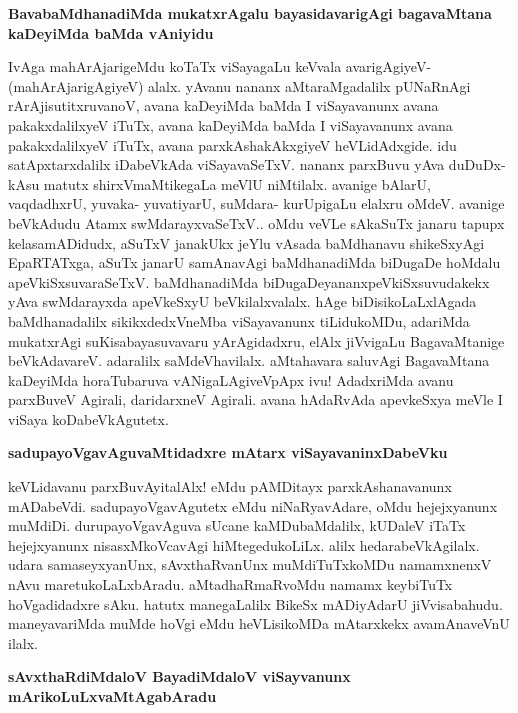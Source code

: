 \noindent
{\bf\large{BavabaMdhanadiMda mukatxrAgalu bayasidavarigAgi bagavaMtana kaDeyiMda baMda vAniyidu}}\label{page251}

IvAga mahArAjarigeMdu koTaTx viSayagaLu keVvala avarigAgiyeV- (mahArAjarigAgiyeV) alalx. yAvanu nananx aMtaraMgadalilx pUNaRnAgi rArAjisutitxruvanoV, avana kaDeyiMda baMda I viSayavanunx avana pakakxdalilxyeV iTuTx, avana kaDeyiMda baMda I viSayavanunx avana pakakxdalilxyeV iTuTx, avana parxkAshakAkxgiyeV heVLidAdxgide. idu satApxtarxdalilx iDabeVkAda viSayavaSeTxV. nananx parxBuvu yAva duDuDx- kAsu matutx shirxVmaMtikegaLa meVlU niMtilalx. avanige bAlarU, vaqdadhxrU, yuvaka- yuvatiyarU, suMdara- kurUpigaLu elalxru oMdeV. avanige beVkAdudu Atamx swMdarayxvaSeTxV.. oMdu veVLe sAkaSuTx janaru tapupx kelasamADidudx, aSuTxV janakUkx jeYlu vAsada baMdhanavu shikeSxyAgi EpaRTATxga, aSuTx janarU samAnavAgi baMdhanadiMda biDugaDe hoMdalu apeVkiSxsuvaraSeTxV. baMdhanadiMda biDugaDeyananxpeVkiSxsuvudakekx yAva swMdarayxda apeVkeSxyU beVkilalxvalalx. hAge biDisikoLaLxlAgada baMdhanadalilx sikikxdedxVneMba viSayavanunx tiLidukoMDu, adariMda mukatxrAgi suKisabayasuvavaru yArAgidadxru, elAlx jiVvigaLu BagavaMtanige beVkAdavareV. adaralilx saMdeVhavilalx. aMtahavara saluvAgi BagavaMtana kaDeyiMda horaTubaruva vANigaLAgiveVpApx ivu! AdadxriMda avanu parxBuveV Agirali, daridarxneV Agirali. avana hAdaRvAda apevkeSxya meVle I viSaya koDabeVkAgutetx.

\noindent
{\bf\large{sadupayoVgavAguvaMtidadxre mAtarx viSayavaninxDabeVku}}\label{page252}

keVLidavanu parxBuvAyitalAlx! eMdu pAMDitayx parxkAshanavanunx mADabeVdi. sadupayoVgavAgutetx eMdu niNaRyavAdare, oMdu hejejxyanunx muMdiDi. durupayoVgavAguva sUcane kaMDubaMdalilx, kUDaleV iTaTx hejejxyanunx nisasxMkoVcavAgi hiMtegedukoLiLx. alilx hedarabeVkAgilalx. udara samaseyxyanUnx, sAvxthaRvanUnx muMdiTuTxkoMDu namamxnenxV nAvu maretukoLaLxbAradu. aMtadhaRmaRvoMdu namamx keybiTuTx hoVgadidadxre sAku. hatutx manegaLalilx BikeSx mADiyAdarU jiVvisabahudu. maneyavariMda muMde hoVgi eMdu heVLisikoMDa mAtarxkekx avamAnaveVnU ilalx.

\noindent
{\bf\large{sAvxthaRdiMdaloV BayadiMdaloV viSayvanunx mArikoLuLxvaMtAgabAradu}}\label{page252}

